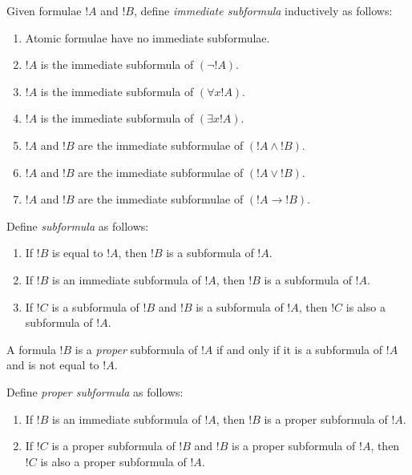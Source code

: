 \documentclass[syntax-and-semantics]{subfiles}
\begin{document}
\begin{defn}
Given formulae $!A$ and $!B$, define \emph{immediate subformula} inductively as follows:
\begin{enumerate}
\item Atomic formulae have no immediate subformulae.
\item $!A$ is the immediate subformula of $(\lnot!A)$.
\item $!A$ is the immediate subformula of $(\forall x !A)$.
\item $!A$ is the immediate subformula of $(\exists x !A)$.
\item $!A$ and $!B$ are the immediate subformulae of $(!A \land !B)$.
\item $!A$ and $!B$ are the immediate subformulae of $(!A \lor !B)$.
\item $!A$ and $!B$ are the immediate subformulae of $(!A \rightarrow !B)$.
\end{enumerate}
\end{defn}


\begin{defn}[Subformula]
Define \emph{subformula} as follows:
\begin{enumerate}
\item If $!B$ is equal to $!A$, then $!B$ is a subformula of $!A$.
\item If $!B$ is an immediate subformula of $!A$, then $!B$ is a subformula of $!A$.
\item If $!C$ is a subformula of $!B$ and $!B$ is a subformula of $!A$, then $!C$ is also a subformula of $!A$.
\end{enumerate}
A formula $!B$ is a \emph{proper} subformula of $!A$ if and only if it is a subformula of $!A$ and is not equal to $!A$.
\end{defn}


\begin{defn}
Define \emph{proper subformula} as follows:
\begin{enumerate}
\item If $!B$ is an immediate subformula of $!A$, then $!B$ is a proper subformula of $!A$.
\item If $!C$ is a proper subformula of $!B$ and $!B$ is a proper subformula of $!A$, then $!C$ is also a proper subformula of $!A$.
\end{enumerate}
\end{defn}
\end{document}
